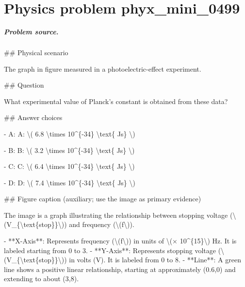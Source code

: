 
\chapter{Physics problem phyx\_mini\_0499}
\label{ch:PhyXMiniProblems_problem_phyx_mini_0499}

\paragraph{Problem source.}
\#\# Physical scenario

The graph in figure measured in a photoelectric-effect experiment.

\#\# Question

What experimental value of Planck’s constant is obtained from these data?

\#\# Answer choices

- A: A: \textbackslash{}( 6.8 \textbackslash{}times 10\textasciicircum{}\{-34\} \textbackslash{}text\{ Js\} \textbackslash{})

- B: B: \textbackslash{}( 3.2 \textbackslash{}times 10\textasciicircum{}\{-34\} \textbackslash{}text\{ Js\} \textbackslash{})

- C: C: \textbackslash{}( 6.4 \textbackslash{}times 10\textasciicircum{}\{-34\} \textbackslash{}text\{ Js\} \textbackslash{})

- D: D: \textbackslash{}( 7.4 \textbackslash{}times 10\textasciicircum{}\{-34\} \textbackslash{}text\{ Js\} \textbackslash{})

\#\# Figure caption (auxiliary; use the image as primary evidence)

The image is a graph illustrating the relationship between stopping voltage (\textbackslash{}(V\_\{\textbackslash{}text\{stop\}\}\textbackslash{})) and frequency (\textbackslash{}(f\textbackslash{})). 

- **X-Axis**: Represents frequency (\textbackslash{}(f\textbackslash{})) in units of \textbackslash{}(× 10\textasciicircum{}\{15\}\textbackslash{}) Hz. It is labeled starting from 0 to 3.
- **Y-Axis**: Represents stopping voltage (\textbackslash{}(V\_\{\textbackslash{}text\{stop\}\}\textbackslash{})) in volts (V). It is labeled from 0 to 8.
- **Line**: A green line shows a positive linear relationship, starting at approximately (0.6,0) and extending to about (3,8).

